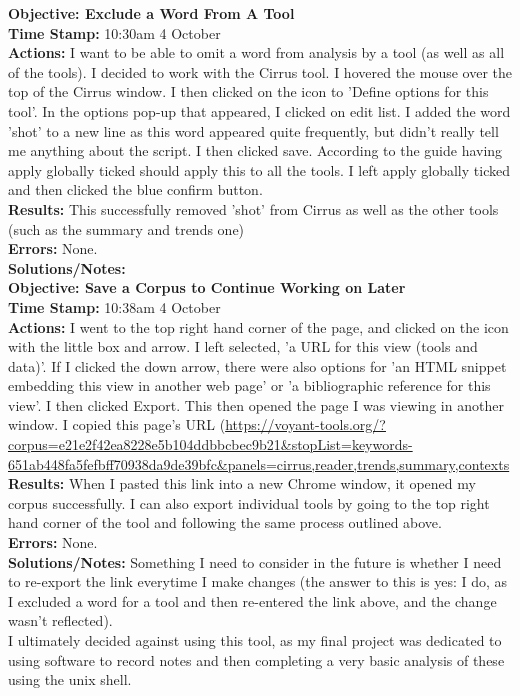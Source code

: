 \documentclass{article}
\begin{document}
\begin{FlushLeft}
\vspace{5mm}
\textbf{Objective: Exclude a Word From A Tool}\\ 
\textbf{Time Stamp:} 10:30am 4 October\\
\textbf{Actions:} I want to be able to omit a word from analysis by a tool (as well as all of the tools). I decided to work with the Cirrus tool. I hovered the mouse over the top of the Cirrus window. I then clicked on the icon to 'Define options for this tool'. In the options pop-up that appeared, I clicked on edit list. I added the word 'shot' to a new line as this word appeared quite frequently, but didn't really tell me anything about the script. I then clicked save. According to the guide having apply globally ticked should apply this to all the tools. I left apply globally ticked and then clicked the blue confirm button.\\
\textbf{Results:} This successfully removed 'shot' from Cirrus as well as the other tools (such as the summary and trends one)\\
\textbf{Errors:} None.\\
\textbf{Solutions/Notes:}\\
\vspace{5mm}
\textbf{Objective: Save a Corpus to Continue Working on Later}\\ 
\textbf{Time Stamp:} 10:38am 4 October\\
\textbf{Actions:} I went to the top right hand corner of the page, and clicked on the icon with the little box and arrow. I left selected, 'a URL for this view (tools and data)'. If I clicked the down arrow, there were also options for 'an HTML snippet embedding this view in another web page' or 'a bibliographic reference for this view'. I then clicked Export. This then opened the page I was viewing in another window. I copied this page's URL (\url{https://voyant-tools.org/?corpus=e21e2f42ea8228e5b104ddbbcbec9b21&stopList=keywords-651ab448fa5fefbff70938da9de39bfc&panels=cirrus,reader,trends,summary,contexts}\\
\textbf{Results:} When I pasted this link into a new Chrome window, it opened my corpus successfully. I can also export individual tools by going to the top right hand corner of the tool and following the same process outlined above.\\
\textbf{Errors:} None.\\
\textbf{Solutions/Notes:} Something I need to consider in the future is whether I need to re-export the link everytime I make changes (the answer to this is yes: I do, as I excluded a word for a tool and then re-entered the link above, and the change wasn't reflected).\\
\vspace{5mm}
I ultimately decided against using this tool, as my final project was dedicated to using software to record notes and then completing a very basic analysis of these using the unix shell.
\vspace{5mm}


\end{FlushLeft}
\end{document}
